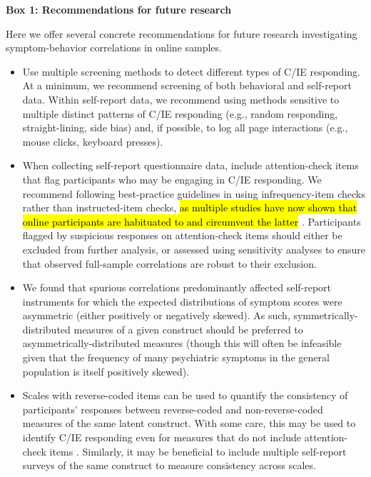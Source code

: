 \documentclass[a4paper,notitlepage,12pt]{article}
\begin{document}
\begin{refsection}[main]
\newpage
\textbf{Box 1: Recommendations for future research}

Here we offer several concrete recommendations for future research investigating symptom-behavior correlations in online samples.

\begin{itemize}

    \item Use multiple screening methods to detect different types of C/IE responding. At a minimum, we recommend screening of both behavioral and self-report data. Within self-report data, we recommend using methods sensitive to multiple distinct patterns of C/IE responding (e.g., random responding, straight-lining, side bias) and, if possible, to log all page interactions (e.g., mouse clicks, keyboard presses).

    \item When collecting self-report questionnaire data, include attention-check items that flag participants who may be engaging in C/IE responding. We recommend following best-practice guidelines in using infrequency-item checks rather than instructed-item checks, \hl{as multiple studies have now shown that online participants are habituated to and circumvent the latter} \cite{barends2019noncompliant, thomas2017validity, hauser2016attentive}. Participants flagged by suspicious responses on attention-check items should either be excluded from further analysis, or assessed using sensitivity analyses to ensure that observed full-sample correlations are robust to their exclusion.

    \item We found that spurious correlations predominantly affected self-report instruments for which the expected distributions of symptom scores were asymmetric (either positively or negatively skewed). As such, symmetrically-distributed measures of a given construct should be preferred to asymmetrically-distributed measures (though this will often be infeasible given that the frequency of many psychiatric symptoms in the general population is itself positively skewed).
    
    \item Scales with reverse-coded items can be used to quantify the consistency of participants' responses between reverse-coded and non-reverse-coded measures of the same latent construct. With some care, this may be used to identify C/IE responding even for measures that do not include attention-check items \cite{emons2009detection}. Similarly, it may be beneficial to include multiple self-report surveys of the same construct to measure consistency across scales.
    

\end{itemize}
\end{refsection}
\end{document}
